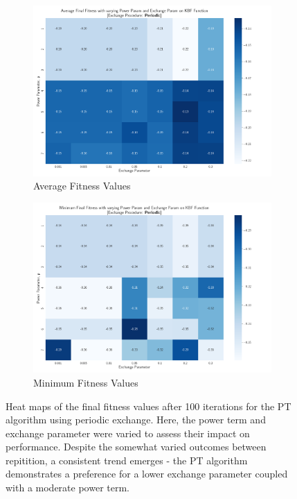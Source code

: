 \documentclass[10pt]{article}
\begin{document}
\begin{multicols}{2}
\begin{figure}[H]
    \centering
    \begin{subfigure}{0.48\textwidth}
        \centering
        \includegraphics[width=\textwidth]{../figures/Permanent Images/PT_Avg_Fitness_Heatmap_Periodic.png}
        \caption{Average Fitness Values}
        \label{fig:avg_periodic_heatmap}
    \end{subfigure}
    \begin{subfigure}{0.48\textwidth}
        \centering
        \includegraphics[width=\textwidth]{../figures/Permanent Images/PT_Min_Fitness_Heatmap_Periodic.png}
        \caption{Minimum Fitness Values}
        \label{fig:min_periodic_heatmap}
    \end{subfigure}
    \captionsetup{justification=centering}
    \caption{Heat maps of the final fitness values after 100 iterations for the PT algorithm using periodic exchange. Here, the power term and exchange parameter were varied to assess their impact on performance. Despite the somewhat varied outcomes between repitition, a consistent trend emerges - the PT algorithm demonstrates a preference for a lower exchange parameter coupled with a moderate power term.}
    \label{fig:heatmap_periodic}
\end{figure}


\end{multicols}
\end{document}

